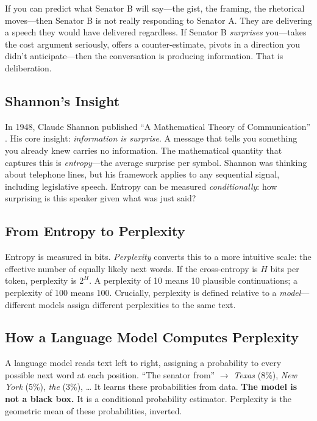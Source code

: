 \documentclass[12pt]{article}
\begin{document}
If you can predict what Senator B will say---the gist, the framing, the rhetorical moves---then Senator B is not really responding to Senator A. They are delivering a speech they would have delivered regardless. If Senator B \textit{surprises} you---takes the cost argument seriously, offers a counter-estimate, pivots in a direction you didn't anticipate---then the conversation is producing information. That is deliberation.

\subsection{Shannon's Insight}

In 1948, Claude Shannon published ``A Mathematical Theory of Communication'' \citep{shannon1948}. His core insight: \textit{information is surprise}. A message that tells you something you already knew carries no information. The mathematical quantity that captures this is \textit{entropy}---the average surprise per symbol. Shannon was thinking about telephone lines, but his framework applies to any sequential signal, including legislative speech. Entropy can be measured \textit{conditionally}: how surprising is this speaker given what was just said?

\subsection{From Entropy to Perplexity}

Entropy is measured in bits. \textit{Perplexity} converts this to a more intuitive scale: the effective number of equally likely next words. If the cross-entropy is $H$ bits per token, perplexity is $2^H$. A perplexity of 10 means 10 plausible continuations; a perplexity of 100 means 100. Crucially, perplexity is defined relative to a \textit{model}---different models assign different perplexities to the same text.

\subsection{How a Language Model Computes Perplexity}

A language model reads text left to right, assigning a probability to every possible next word at each position. ``The senator from'' $\rightarrow$ \textit{Texas} (8\%), \textit{New York} (5\%), \textit{the} (3\%), \ldots{} It learns these probabilities from data. \textbf{The model is not a black box.} It is a conditional probability estimator. Perplexity is the geometric mean of these probabilities, inverted.
\end{document}
